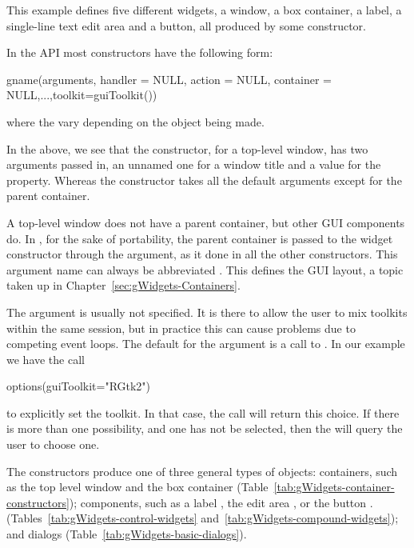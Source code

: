 This example defines five different widgets, a window, a box
container, a label, a single-line text edit area and a button, all
produced by some constructor.


In the  API most constructors have the following form: 
\begin{Schunk}
\begin{Sinput}
 gname(arguments, handler = NULL, action = NULL, 
       container = NULL,...,toolkit=guiToolkit())
\end{Sinput}
\end{Schunk}
where the  vary depending on the object being made. 

In the above, we see that the  constructor, for a
top-level window, has two arguments passed in, an unnamed one for a
window title and a value for the  property. Whereas the
 constructor takes all the default arguments except for
the parent container.

A top-level window does not have a parent container, but other GUI
components do. In , for the sake of portability, the
parent container is passed to the widget constructor through the
 argument, as it done in all the other constructors.
This argument name can always be abbreviated . This defines
the GUI layout, a topic taken up in
Chapter~\ref{sec:gWidgets-Containers}.

The  argument is usually not specified. It is there to
allow the user to mix toolkits within the same \R\/ session, but in
practice this can cause problems due to competing event loops. The default
for the  argument is a call to . 
In our example we have the call
\begin{Schunk}
\begin{Sinput}
 options(guiToolkit="RGtk2")
\end{Sinput}
\end{Schunk}
to explicitly set the toolkit. In that case, the call will return this
choice. If there is more than one possibility, and one has not be
selected, then the  will query the user to choose one.

The constructors produce one of three general types of objects: containers,
such as the top level window  and the box container 
(Table~\ref{tab:gWidgets-container-constructors}); components, such as
a label , the edit area , or the button .
(Tables~\ref{tab:gWidgets-control-widgets}
and~\ref{tab:gWidgets-compound-widgets}); and dialogs (Table~\ref{tab:gWidgets-basic-dialogs}).



